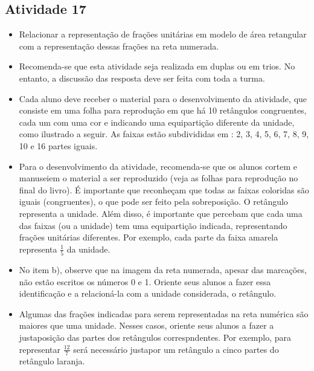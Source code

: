\documentclass[oneside]{book}
\begin{document}
\begin{multicols}{2}
\subsection{Atividade 17}

\begin{itemize} %
    \item       Relacionar a representação de frações unitárias em modelo de área retangular com a representação dessas frações na reta numerada. 
\end{itemize} %
    
\begin{itemize} %
    \item       Recomenda-se que esta atividade seja realizada em duplas ou em trios. No entanto, a discussão das resposta deve ser feita com toda a turma.
    \item       Cada aluno deve receber o material para o desenvolvimento da atividade, que consiste em uma folha para reprodução em que há 10 retângulos congruentes, cada um com uma cor e indicando uma equipartição diferente da unidade, como ilustrado a seguir. As faixas estão subdivididas em : 2, 3, 4, 5, 6, 7, 8, 9, 10 e 16 partes iguais. 
    \item       Para o desenvolvimento da atividade, recomenda-se que os alunos cortem e manuseiem o material a ser reproduzido (veja as folhas para reprodução no final do livro). É importante que reconheçam que todas as faixas coloridas são iguais (congruentes), o que pode ser feito pela sobreposição. O retângulo representa a unidade. Além disso, é importante que percebam que cada uma das faixas (ou a unidade) tem uma equipartição indicada, representando frações unitárias diferentes. Por exemplo, cada parte da faixa amarela representa       $\frac{1}{5}$       da unidade.
    \item       No item b), observe que na imagem da reta numerada, apesar das marcações, não estão escritos os números 0 e 1. Oriente seus alunos a fazer essa identificação e a relacioná-la com a unidade considerada, o retângulo.
    \item       Algumas das frações indicadas para serem representadas na reta numérica são maiores que uma unidade. Nesses casos, oriente seus alunos a fazer a justaposição das partes dos retângulos correspndentes. Por exemplo, para representar       $\frac{12}{7}$       será necessário justapor um retângulo a cinco partes do retângulo laranja.
\end{itemize} %


\end{multicols}
\end{document}
